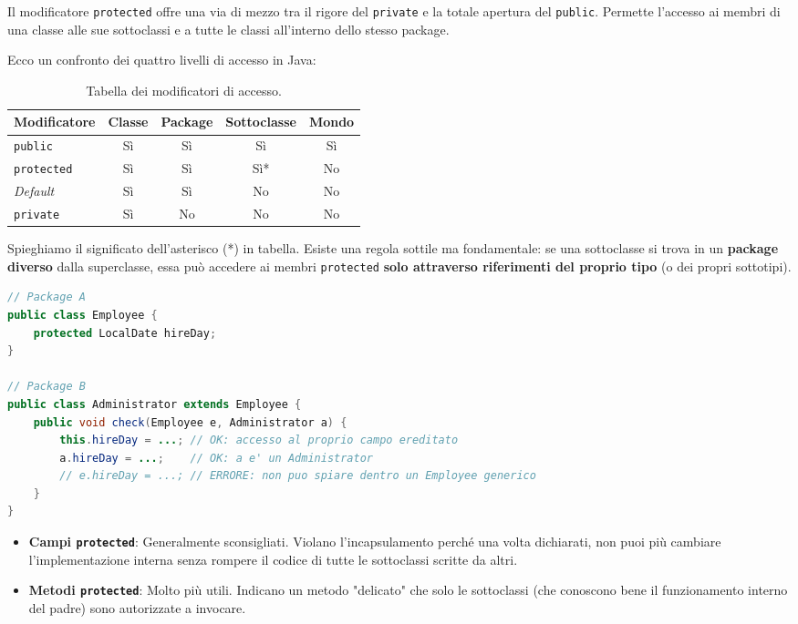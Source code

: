 Il modificatore \texttt{protected} offre una via di mezzo tra il rigore del \texttt{private} e la totale apertura del \texttt{public}. Permette l'accesso ai membri di una classe alle sue sottoclassi e a tutte le classi all'interno dello stesso package.

Ecco un confronto dei quattro livelli di accesso in Java:

\begin{table}[h]
\centering
\begin{tabular}{|l|c|c|c|c|}
\hline
\textbf{Modificatore} & \textbf{Classe} & \textbf{Package} & \textbf{Sottoclasse} & \textbf{Mondo} \\ \hline
\texttt{public}       & Sì              & Sì               & Sì                   & Sì             \\ \hline
\texttt{protected}    & Sì              & Sì               & Sì* & No             \\ \hline
\textit{Default}      & Sì              & Sì               & No                   & No             \\ \hline
\texttt{private}      & Sì              & No               & No                   & No             \\ \hline
\end{tabular}
\caption{Tabella dei modificatori di accesso.}
\end{table}


Spieghiamo il significato dell'asterisco (*) in tabella. Esiste una regola sottile ma fondamentale: se una sottoclasse si trova in un \textbf{package diverso} dalla superclasse, essa può accedere ai membri \texttt{protected} \textbf{solo attraverso riferimenti del proprio tipo} (o dei propri sottotipi).

\begin{lstlisting}[language=Java, caption={Restrizione di accesso protected}]
// Package A
public class Employee {
    protected LocalDate hireDay;
}

// Package B
public class Administrator extends Employee {
    public void check(Employee e, Administrator a) {
        this.hireDay = ...; // OK: accesso al proprio campo ereditato
        a.hireDay = ...;    // OK: a e' un Administrator
        // e.hireDay = ...; // ERRORE: non puo spiare dentro un Employee generico
    }
}
\end{lstlisting}

\begin{tip}
\begin{itemize}
    \item \textbf{Campi \texttt{protected}}: Generalmente sconsigliati. Violano l'incapsulamento perché una volta dichiarati, non puoi più cambiare l'implementazione interna senza rompere il codice di tutte le sottoclassi scritte da altri.
    \item \textbf{Metodi \texttt{protected}}: Molto più utili. Indicano un metodo "delicato" che solo le sottoclassi (che conoscono bene il funzionamento interno del padre) sono autorizzate a invocare.
\end{itemize}
\end{tip}

